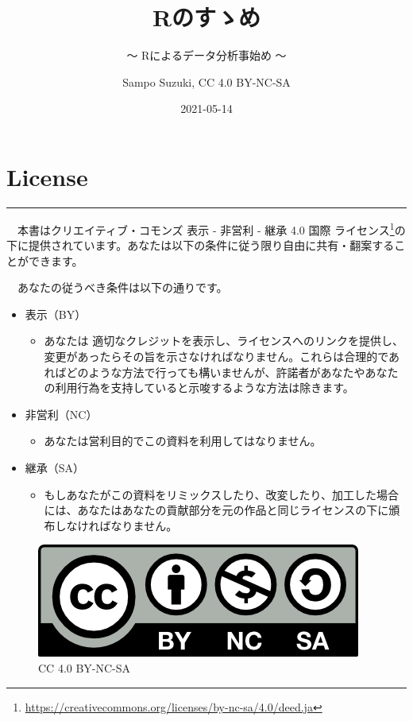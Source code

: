 \documentclass[
  12pt,
]{book}
\title{Rのすゝめ}
\subtitle{〜 Rによるデータ分析事始め 〜}
\author{Sampo Suzuki, CC 4.0 BY-NC-SA}
\date{2021-05-14}
\DeclareRobustCommand{\href}[2]{#2\footnote{\url{#1}}}
\providecommand{\tightlist}{%
  \setlength{\itemsep}{0pt}\setlength{\parskip}{0pt}}
\begin{document}
\maketitle

{
\hypersetup{linkcolor=}
\setcounter{tocdepth}{2}
\tableofcontents
}
\hypertarget{license}{%
\chapter*{License}\label{license}}

\begin{center}\rule{0.5\linewidth}{0.5pt}\end{center}

　本書は\href{https://creativecommons.org/licenses/by-nc-sa/4.0/deed.ja}{クリエイティブ・コモンズ 表示 - 非営利 - 継承 4.0 国際 ライセンス}の下に提供されています。あなたは以下の条件に従う限り自由に共有・翻案することができます。

　あなたの従うべき条件は以下の通りです。

\begin{itemize}
\item
  表示（BY）

  \begin{itemize}
  \tightlist
  \item
    あなたは 適切なクレジットを表示し、ライセンスへのリンクを提供し、変更があったらその旨を示さなければなりません。これらは合理的であればどのような方法で行っても構いませんが、許諾者があなたやあなたの利用行為を支持していると示唆するような方法は除きます。
  \end{itemize}
\item
  非営利（NC）

  \begin{itemize}
  \tightlist
  \item
    あなたは営利目的でこの資料を利用してはなりません。
  \end{itemize}
\item
  継承（SA）

  \begin{itemize}
  \tightlist
  \item
    もしあなたがこの資料をリミックスしたり、改変したり、加工した場合には、あなたはあなたの貢献部分を元の作品と同じライセンスの下に頒布しなければなりません。
  \end{itemize}
\end{itemize}

\begin{figure}
\centering
\includegraphics{"./fig/by-nc-sa.png"}
\caption{CC 4.0 BY-NC-SA}
\end{figure}
\end{document}
